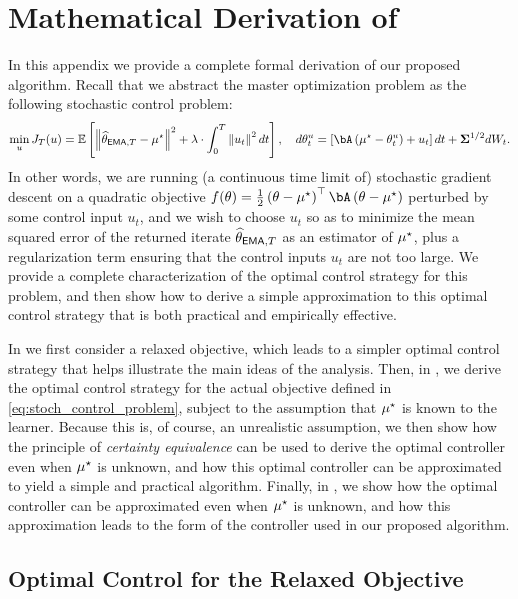 \section{Mathematical Derivation of \pace}\label{app:stoch_control_derivation}\label{sec:app-stoch-control}

In this appendix we provide a complete formal derivation of our proposed algorithm.  Recall that we abstract the master optimization problem as the following stochastic control problem:
\begin{align}\label{eq:stoch_control_problem}
    \min_{u} J_T(u) = \ee\left[ \norm{\thetema[T] - \mustar}^2 + \lambda \cdot \int_0^T \norm{u_t}^2 d t \right], \quad  d \theta_t^u = \left[ \bA \left( \mustar - \theta_t^u \right) + u_t \right] d t + \bSigma^{1/2} d W_t.
\end{align}
In other words, we are running (a continuous time limit of) stochastic gradient descent on a quadratic objective $f(\theta) = \frac 12 \left(\theta - \mustar  \right)^\top \bA \left( \theta - \mustar\right)$ perturbed by some control input $u_t$, and we wish to choose $u_t$ so as to minimize the mean squared error of the returned iterate $\thetema[T]$ as an estimator of $\mustar$, plus a regularization term ensuring that the control inputs $u_t$ are not too large.  We provide a complete characterization of the optimal control strategy for this problem, and then show how to derive a simple approximation to this optimal control strategy that is both practical and empirically effective.

In  we first consider a relaxed objective, which leads to a simpler optimal control strategy that helps illustrate the main ideas of the analysis.  Then, in , we derive the optimal control strategy for the actual objective defined in \eqref{eq:stoch_control_problem}, subject to the assumption that $\mustar$ is known to the learner.  Because this is, of course, an unrealistic assumption, we then show how the principle of \emph{certainty equivalence} can be used to derive the optimal controller even when $\mustar$ is unknown, and how this optimal controller can be approximated to yield a simple and practical algorithm.  Finally, in , we show how the optimal controller can be approximated even when $\mustar$ is unknown, and how this approximation leads to the form of the controller used in our proposed algorithm.  



\subsection{Optimal Control for the Relaxed Objective}\label{app:relaxed_objective}

